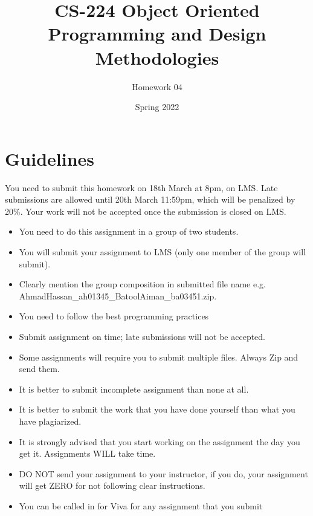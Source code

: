 \documentclass[a4paper,12pt]{article}
\begin{document}
	
	\title{CS-224 Object Oriented Programming and Design Methodologies }
	\author{Homework 04}
	\date{Spring 2022}
	\maketitle
	\section{Guidelines}
	
	You need to submit this homework on  {\color{blue}18th March at 8pm}, on LMS. Late submissions are allowed until {\color{red} 20th March 11:59pm}, which will be penalized by 20\%. Your work will not be accepted once the submission is closed on LMS.

	
	\begin{itemize}
		\item You need to do this assignment in a group of two students.
		\item You will submit your assignment to LMS (only one member of the group will submit).
		\item Clearly mention the group composition in submitted file name e.g. AhmadHassan\_ah01345\_BatoolAiman\_ba03451.zip. 
		\item You need to follow the best programming practices 
		\item Submit assignment on time; late submissions will not be accepted.
		\item Some assignments will require you to submit multiple files. Always Zip and send them.
		\item It is better to submit incomplete assignment than none at all.
		\item It is better to submit the work that you have done yourself than what you have plagiarized.
		\item It is strongly advised that you start working on the assignment the day you get it. Assignments WILL take time.
		\item DO NOT send your assignment to your instructor, if you do, your assignment will get ZERO for not following clear instructions.
		\item You can be called in for Viva for any assignment that you submit
	\end{itemize}
	
\end{document}
